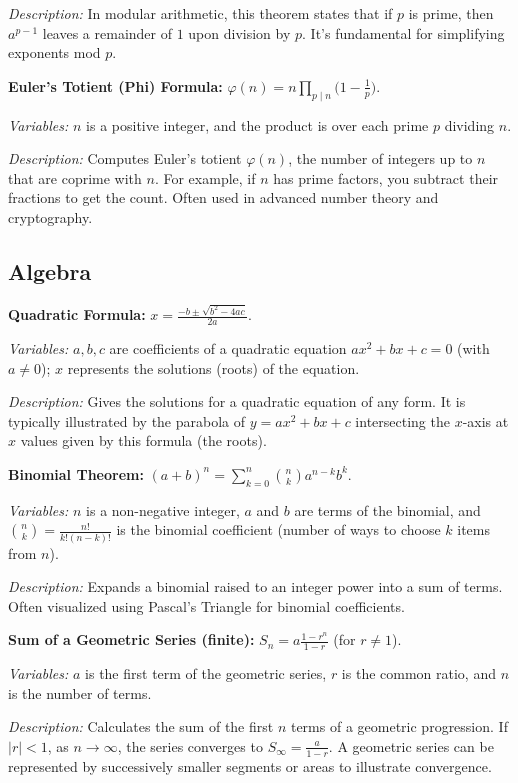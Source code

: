 \documentclass{article}
\begin{document}
\textit{Description:} In modular arithmetic, this theorem states that if $p$ is prime, then $a^{p-1}$ leaves a remainder of $1$ upon division by $p$. It’s fundamental for simplifying exponents mod $p$.

\textbf{Euler's Totient (Phi) Formula:} $\varphi(n) = n \displaystyle\prod_{p \mid n}\Big(1 - \frac{1}{p}\Big)$.

\textit{Variables:} $n$ is a positive integer, and the product is over each prime $p$ dividing $n$.

\textit{Description:} Computes Euler’s totient $\varphi(n)$, the number of integers up to $n$ that are coprime with $n$. For example, if $n$ has prime factors, you subtract their fractions to get the count. Often used in advanced number theory and cryptography.

\subsection*{Algebra}

\textbf{Quadratic Formula:} $x = \frac{-b \pm \sqrt{b^2 - 4ac}}{2a}$.

\textit{Variables:} $a, b, c$ are coefficients of a quadratic equation $ax^2 + bx + c = 0$ (with $a\neq 0$); $x$ represents the solutions (roots) of the equation.

\textit{Description:} Gives the solutions for a quadratic equation of any form. It is typically illustrated by the parabola of $y = ax^2+bx+c$ intersecting the $x$-axis at $x$ values given by this formula (the roots).

\textbf{Binomial Theorem:} $(a + b)^n = \sum_{k=0}^{n}\binom{n}{k} a^{n-k} b^k$.

\textit{Variables:} $n$ is a non-negative integer, $a$ and $b$ are terms of the binomial, and $\binom{n}{k} = \frac{n!}{k!(n-k)!}$ is the binomial coefficient (number of ways to choose $k$ items from $n$).

\textit{Description:} Expands a binomial raised to an integer power into a sum of terms. Often visualized using Pascal’s Triangle for binomial coefficients.

\textbf{Sum of a Geometric Series (finite):} $S_n = a \frac{1 - r^n}{1 - r}$ (for $r \neq 1$).

\textit{Variables:} $a$ is the first term of the geometric series, $r$ is the common ratio, and $n$ is the number of terms.

\textit{Description:} Calculates the sum of the first $n$ terms of a geometric progression. If $|r|<1$, as $n \to \infty$, the series converges to $S_{\infty} = \frac{a}{1-r}$. A geometric series can be represented by successively smaller segments or areas to illustrate convergence.
\end{document}
